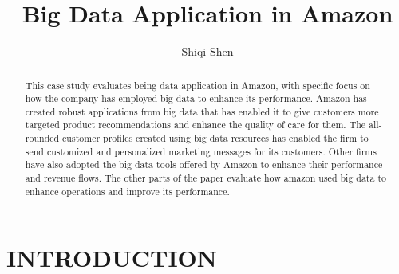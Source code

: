 \documentclass[sigconf]{acmart}
\begin{document}
\title{Big Data Application in Amazon}

\author{Shiqi Shen}

\begin{abstract}

This case study evaluates being data application in Amazon, with specific focus on how the company has employed big data to enhance its performance. Amazon has created robust applications from 
big data that has enabled it to give customers more targeted product recommendations and enhance the quality of care for them. The all-rounded customer profiles created using big data resources 
has enabled the firm to send customized and personalized marketing messages for its customers. Other firms have also adopted the big data tools offered by Amazon to enhance their performance and 
revenue flows. The other parts of the paper evaluate how amazon used big data to enhance operations and improve its performance. 
    
\end{abstract}


\maketitle

\section{INTRODUCTION}
\end{document}
